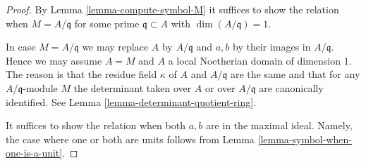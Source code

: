 \begin{proof}
By Lemma \ref{lemma-compute-symbol-M} it suffices to show the relation when
$M = A/\mathfrak q$ for some prime $\mathfrak q \subset A$ with
$\dim(A/\mathfrak q) = 1$.

\medskip\noindent
In case $M = A/\mathfrak q$ we may replace $A$ by $A/\mathfrak q$ and
$a, b$ by their images in $A/\mathfrak q$. Hence we may assume $A = M$
and $A$ a local Noetherian domain of dimension $1$. The reason is
that the residue field $\kappa$ of $A$ and $A/\mathfrak q$ are
the same and that for any $A/\mathfrak q$-module $M$ the determinant
taken over $A$ or over $A/\mathfrak q$ are canonically identified.
See Lemma \ref{lemma-determinant-quotient-ring}.

\medskip\noindent
It suffices to show the relation when both
$a, b$ are in the maximal ideal. Namely, the case where one
or both are units follows from Lemma \ref{lemma-symbol-when-one-is-a-unit}.


\end{proof}
